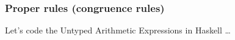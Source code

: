 \documentclass{beamer}
\begin{document}
\begin{frame}
\frametitle{Proper rules (congruence rules)} 

\begin{prooftree}
\end{prooftree}

\begin{prooftree}
\end{prooftree}

\begin{prooftree}
\end{prooftree}

\begin{prooftree}
\end{prooftree}
\end{frame}


\begin{frame}
Let's code the Untyped Arithmetic Expressions in Haskell \ldots
\end{frame}
\end{document}
